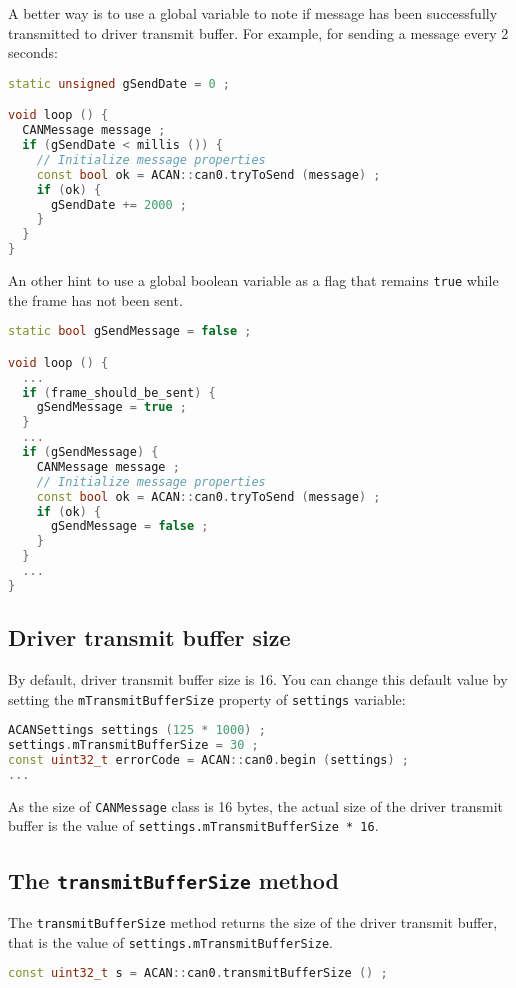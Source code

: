 \documentclass[9pt, a4paper, obeyspaces, openany]{extarticle}
\newcommand \subsectionLabel[2]{\subsection{#1}\label{subsec:#2}}
\begin{document}
A better way is to use a global variable to note if  message has been successfully transmitted to driver transmit buffer. For example, for sending a message every 2 seconds: 

{ \small
  \begin{lstlisting}[language=c++]
static unsigned gSendDate = 0 ;

void loop () {
  CANMessage message ;
  if (gSendDate < millis ()) {
    // Initialize message properties
    const bool ok = ACAN::can0.tryToSend (message) ;
    if (ok) {
      gSendDate += 2000 ;
    }
  }
}
  \end{lstlisting}
}

An other hint to use a global boolean variable as a flag that remains \texttt{true} while the frame has not been sent.

{ \small
  \begin{lstlisting}[language=c++]
static bool gSendMessage = false ;

void loop () {
  ...
  if (frame_should_be_sent) {
    gSendMessage = true ;
  }
  ...
  if (gSendMessage) {
    CANMessage message ;
    // Initialize message properties
    const bool ok = ACAN::can0.tryToSend (message) ;
    if (ok) {
      gSendMessage = false ;
    }
  }
  ...
}
  \end{lstlisting}
}


\subsectionLabel{Driver transmit buffer size}{driverTransmitBufferSize}

By default, driver transmit buffer size is 16. You can change this default value by setting the \texttt{mTransmitBufferSize} property of \texttt{settings} variable:

{ \small\begin{lstlisting}[language=c++]
ACANSettings settings (125 * 1000) ;
settings.mTransmitBufferSize = 30 ;
const uint32_t errorCode = ACAN::can0.begin (settings) ;
...
\end{lstlisting}}

As the size of \texttt{CANMessage} class is 16 bytes, the actual size of the driver transmit buffer is the value of \texttt{settings.mTransmitBufferSize * 16}.


\subsection{The \texttt{transmitBufferSize} method}

The \texttt{transmitBufferSize} method returns the size of the driver transmit buffer, that is the value of \texttt{settings.mTransmitBufferSize}.
{ \small\begin{lstlisting}[language=c++]
const uint32_t s = ACAN::can0.transmitBufferSize () ;
\end{lstlisting}}
\end{document}
